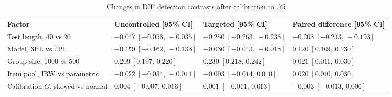 \begin{table}[htbp]\centering
\caption{Changes in DIF detection contrasts after calibration to .75}
\label{tab:s5-did}
{\scriptsize\setlength{\tabcolsep}{2pt}\begin{tabular}{>{\raggedright\arraybackslash}p{}>{\centering\arraybackslash}p{}>{\centering\arraybackslash}p{}>{\centering\arraybackslash}p{}}
\toprule
Factor & Uncontrolled [95\% CI] & Targeted [95\% CI] & Paired difference [95\% CI] \\
\midrule
Test length, 40 vs 20 & $-0.047\;[-0.058,\,-0.035]$ & $-0.250\;[-0.263,\,-0.238]$ & $-0.203\;[-0.213,\,-0.193]$ \\
Model, 3PL vs 2PL & $-0.150\;[-0.162,\,-0.138]$ & $-0.030\;[-0.043,\,-0.018]$ & $0.120\;[0.109,\,0.130]$ \\
Group size, 1000 vs 500 & $0.209\;[0.197,\,0.220]$ & $0.230\;[0.218,\,0.242]$ & $0.021\;[0.011,\,0.030]$ \\
Item pool, IRW vs parametric & $-0.022\;[-0.034,\,-0.011]$ & $-0.003\;[-0.014,\,0.010]$ & $0.020\;[0.010,\,0.030]$ \\
Calibration $G$, skewed vs normal & $0.004\;[-0.007,\,0.016]$ & $0.001\;[-0.011,\,0.013]$ & $-0.003\;[-0.013,\,0.006]$ \\
\bottomrule
\end{tabular}}
\end{table}
